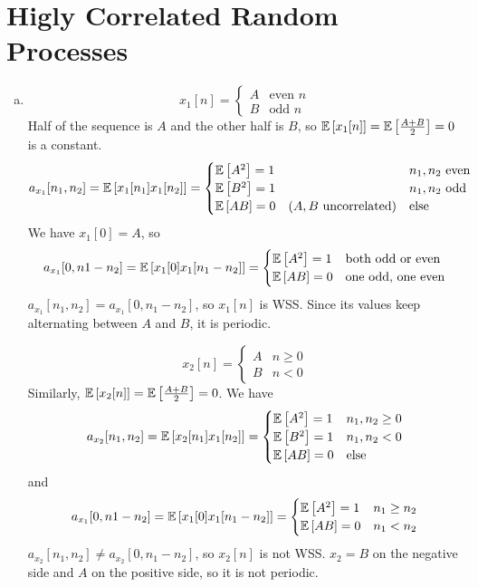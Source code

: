 \section{Higly Correlated Random Processes}\label{sec:p2}

\begin{enumerate}[(a)]
\item
\[x_1[n] = \begin{cases}A & \text{even } n \\ B & \text{odd } n \end{cases}\]
Half of the sequence is $A$ and the other half is $B$, so $\mathbb{E} \left[ x_1[n] \right] = \mathbb{E} \left[ \frac{A+B}{2} \right] = 0$ is a constant. \[a_{x_1}[n_1,n_2] = \mathbb{E} \left[ x_1[n_1]x_1[n_2] \right] = \begin{cases}
\mathbb{E} \left[ A^2 \right] = 1 & n_1, n_2 \text{ even}\\
\mathbb{E} \left[ B^2 \right] = 1 & n_1, n_2 \text{ odd}\\
\mathbb{E} \left[ AB \right] = 0 \quad (A, B \text{ uncorrelated}) & \text{else}
\end{cases}\]
We have $x_1[0]=A$, so
\[a_{x_1}[0,n1-n_2] = \mathbb{E} \left[ x_1[0]x_1[n_1-n_2] \right] = \begin{cases}
\mathbb{E} \left[ A^2 \right] = 1 & \text{both odd or even} \\
\mathbb{E} \left[ AB \right] = 0  & \text{one odd, one even} \\
\end{cases}\]
$a_{x_1}[n_1,n_2] = a_{x_1}[0,n_1-n_2]$, so $x_1[n]$ is WSS. Since its values keep alternating between $A$ and $B$, it is periodic.

\[x_2[n] = \begin{cases}A & n \geq 0 \\ B & n < 0 \end{cases}\]
Similarly, $\mathbb{E} \left[ x_2[n] \right] = \mathbb{E} \left[ \frac{A+B}{2} \right]=0$. We have
\[a_{x_2}[n_1,n_2] = \mathbb{E} \left[ x_2[n_1]x_1[n_2] \right] = \begin{cases}
\mathbb{E} \left[ A^2 \right] = 1 & n_1, n_2 \geq 0\\
\mathbb{E} \left[ B^2 \right] = 1 & n_1, n_2 <0\\
\mathbb{E} \left[ AB \right] = 0 & \text{else}
\end{cases}\]
and 
\[a_{x_1}[0,n1-n_2] = \mathbb{E} \left[ x_1[0]x_1[n_1-n_2] \right] = \begin{cases}
\mathbb{E} \left[ A^2 \right] = 1 & n_1 \geq n_2 \\
\mathbb{E} \left[ AB \right] = 0 & n_1 < n_2
\end{cases}\]
$a_{x_2}[n_1,n_2] \neq a_{x_2}[0,n_1-n_2]$, so $x_2[n]$ is not WSS. $x_2 = B$ on the negative side and $A$ on the positive side, so it is not periodic.


\end{enumerate}
